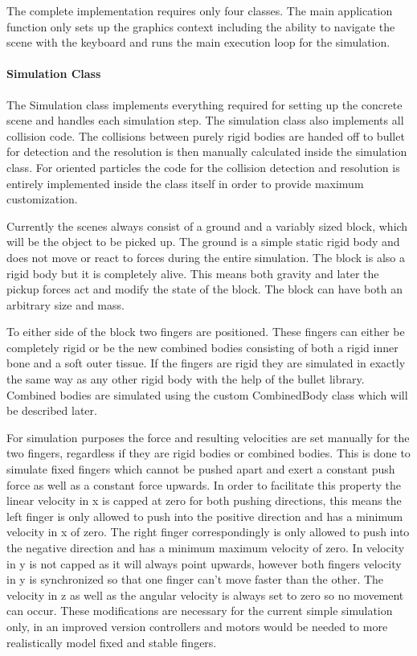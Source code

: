 The complete implementation requires only four classes. The main application function only sets up the graphics context including the ability to navigate the scene with the keyboard and runs the main execution loop for the simulation.

\paragraph{Simulation Class}
The Simulation class implements everything required for setting up the concrete scene and handles each simulation step. The simulation class also implements all collision code. The collisions between purely rigid bodies are handed off to bullet for detection and the resolution is then manually calculated inside the simulation class. For oriented particles the code for the collision detection and resolution is entirely implemented inside the class itself in order to provide maximum customization.

Currently the scenes always consist of a ground and a variably sized block, which will be the object to be picked up. The ground is a simple static rigid body and does not move or react to forces during the entire simulation. The block is also a rigid body but it is completely alive. This means both gravity and later the pickup forces act and modify the state of the block. The block can have both an arbitrary size and mass.

To either side of the block two fingers are positioned. These fingers can either be completely rigid or be the new combined bodies consisting of both a rigid inner bone and a soft outer tissue. If the fingers are rigid they are simulated in exactly the same way as any other rigid body with the help of the bullet library. Combined bodies are simulated using the custom CombinedBody class which will be described later.

For simulation purposes the force and resulting velocities are set manually for the two fingers, regardless if they are rigid bodies or combined bodies. This is done to simulate fixed fingers which cannot be pushed apart and exert a constant push force as well as a constant force upwards. In order to facilitate this property the linear velocity in x is capped at zero for both pushing directions, this means the left finger is only allowed to push into the positive direction and has a minimum velocity in x of zero. The right finger correspondingly is only allowed to push into the negative direction and has a minimum maximum velocity of zero. In velocity in y is not capped as it will always point upwards, however both fingers velocity in y is synchronized so that one finger can't move faster than the other. The velocity in z as well as the angular velocity is always set to zero so no movement can occur. These modifications are necessary for the current simple simulation only, in an improved version controllers and motors would be needed to more realistically model fixed and stable fingers.


